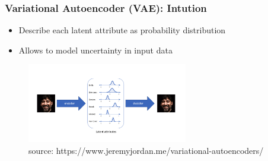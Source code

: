 \begin{frame}
\frametitle{Variational Autoencoder (VAE): Intution}

\begin{itemize}
\item Describe each latent attribute as probability distribution
\item Allows to model uncertainty in input data
\end{itemize}

                \begin{figure}
                \centering
                \includegraphics[width=7cm]{plots/vae_intution.png}
                \vspace{-8pt}
                \caption{\tiny{source: https://www.jeremyjordan.me/variational-autoencoders/}}
                \end{figure}
                

\end{frame}



